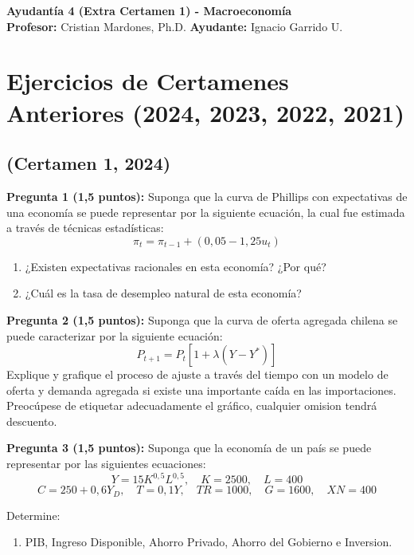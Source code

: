 \documentclass[11pt,addpoints]{article}
\begin{document}
\vspace*{0.01cm}

\begin{center}
{\Large \bfseries Ayudantía 4 (Extra Certamen 1) - Macroeconomía \\[0.5cm]}
\textbf{Profesor:} Cristian Mardones, Ph.D. \quad \textbf{Ayudante:} Ignacio Garrido U.
\end{center}

\section*{\textbf{Ejercicios de Certamenes Anteriores (2024, 2023, 2022, 2021)}}

\subsection*{(Certamen 1, 2024)}
\textbf{Pregunta 1 (1,5 puntos):}  
Suponga que la curva de Phillips con expectativas de una economía se puede representar por la siguiente ecuación, la cual fue estimada a través de técnicas estadísticas:
\[
\pi_t = \pi_{t-1} + (0,05 - 1,25u_t)
\]
\begin{enumerate}[label=\alph*)]
    \item ¿Existen expectativas racionales en esta economía? ¿Por qué?
    \item ¿Cuál es la tasa de desempleo natural de esta economía? 
\end{enumerate}

\textbf{Pregunta 2 (1,5 puntos):}  
Suponga que la curva de oferta agregada chilena se puede caracterizar por la siguiente ecuación:
\[
P_{t+1} = P_t \left[ 1 + \lambda (Y - Y^*) \right]
\]
Explique y grafique el proceso de ajuste a través del tiempo con un modelo de oferta y demanda agregada si existe una importante caída en las importaciones. Preocúpese  de etiquetar adecuadamente el gráfico, cualquier omision tendrá descuento.

\vspace{0.3cm}

\textbf{Pregunta 3 (1,5 puntos):}  
Suponga que la economía de un país se puede representar por las siguientes ecuaciones:
\[
Y = 15K^{0,5}L^{0,5}, \quad K=2500, \quad L=400
\]
\[
C = 250 + 0,6Y_D, \quad T = 0,1Y, \quad TR=1000, \quad G=1600, \quad XN=400
\]

Determine:
\begin{enumerate}[label=\alph*)]
    \item PIB, Ingreso Disponible, Ahorro Privado, Ahorro del Gobierno e Inversion.  
\end{enumerate}
\vspace{0.3cm}
\end{document}
